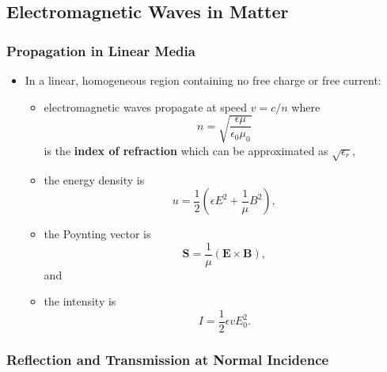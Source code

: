 \documentclass{article}
\renewcommand{\vec}[1]{\boldsymbol{\mathbf{#1}}}
\begin{document}
\subsection{Electromagnetic Waves in Matter}

\subsubsection{Propagation in Linear Media}

\begin{itemize}
  \item In a linear, homogeneous region containing no free charge or free current:

        \begin{itemize}
          \item electromagnetic waves propagate at speed $v = c / n$ where \[n = \sqrt{\frac{\epsilon \mu}{\epsilon_0 \mu_0}}\] is the \textbf{index of refraction} which can be approximated as $\sqrt{\epsilon_r}$,

          \item the energy density is \[u = \frac{1}{2} \left( \epsilon E^2 + \frac{1}{\mu} B^2 \right),\]

          \item the Poynting vector is \[\vec{S} = \frac{1}{\mu} (\vec{E} \times \vec{B}),\] and

          \item the intensity is \[I = \frac{1}{2} \epsilon v E_0^2.\]
        \end{itemize}
\end{itemize}

\subsubsection{Reflection and Transmission at Normal Incidence}
\end{document}
